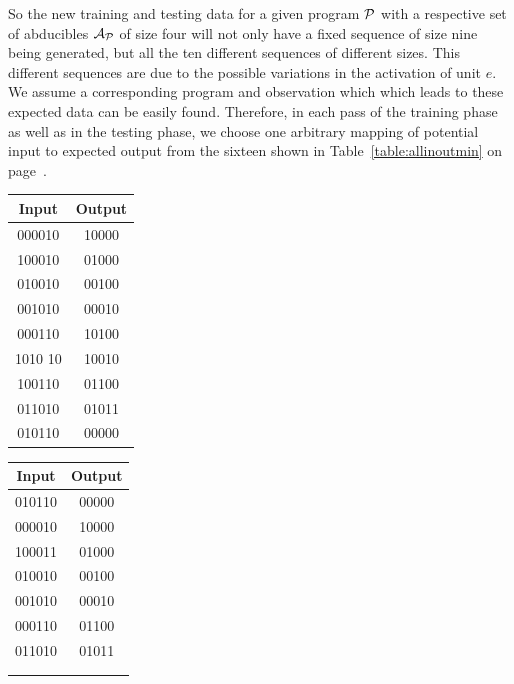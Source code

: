 So the new training and testing data for a given program $\mathcal{P}$ with a respective set of abducibles $\mathcal{A}_{\mathcal{P}}$ of size four will not only have a fixed sequence of size nine being generated, but all the ten different sequences of different sizes. This different sequences are due to the possible variations in the activation of unit $e$. We assume a corresponding program and observation which which leads to these expected data can be easily found. Therefore, in each pass of the training phase as well as in the testing phase, we choose one arbitrary mapping of potential input to expected output from the sixteen shown in Table~\ref{table:allinoutmin} on page~\pageref{table:allinoutmin}.

\begin{table}
	\begin{subtable}[h]{0.10\textwidth}
		\centering
		\begin{tabular}{cc}
		Input & Output \\
		\hline
		000010	&	10000 \\
		100010	&	01000 \\
		010010	&	00100 \\
		001010	&	00010 \\
		000110	&	10100 \\
		1010	10	&	10010 \\
		100110	&	01100 \\
		011010	&	01011 \\
		010110	&	00000 \\
		\end{tabular}
		\bigskip
		\label{table:trainingexplanations:zero}
	\end{subtable}
	\hspace{3.75cm}
	\begin{subtable}[h]{0.10\textwidth}
		\centering
		\begin{tabular}{cc}
		Input & Output \\
		\hline
		010110	&	00000\\
		000010	&	10000\\
		100011	&	01000\\
		010010	&	00100\\
		001010	&	00010\\
		000110	&	01100\\
		011010	&	01011\\
		&\\
		&\\
		\end{tabular}
		\bigskip

\end{subtable}
\end{table}
